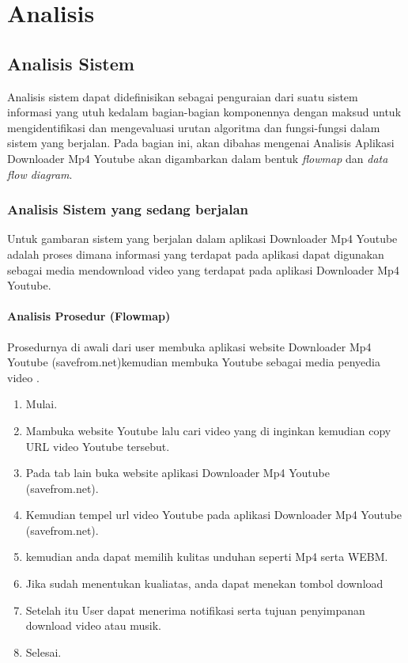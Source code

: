 \chapter{Analisis}
\section{Analisis Sistem}
Analisis sistem dapat didefinisikan sebagai penguraian dari suatu sistem informasi yang utuh kedalam bagian-bagian komponennya dengan maksud untuk mengidentifikasi dan mengevaluasi urutan algoritma dan fungsi-fungsi dalam sistem yang berjalan. Pada bagian ini, akan dibahas mengenai Analisis Aplikasi Downloader Mp4 Youtube akan digambarkan dalam bentuk \textit{flowmap} dan \textit{data flow diagram}.

\subsection{Analisis Sistem yang sedang berjalan}
Untuk gambaran sistem yang berjalan dalam aplikasi Downloader Mp4 Youtube adalah proses dimana informasi yang terdapat pada aplikasi dapat digunakan sebagai media mendownload video yang terdapat pada aplikasi Downloader Mp4 Youtube. 

\subsubsection{Analisis Prosedur (Flowmap)}
Prosedurnya di awali dari user membuka aplikasi website Downloader Mp4 Youtube {(savefrom.net)}kemudian membuka Youtube sebagai media penyedia video .

\begin{enumerate}
    \item Mulai.
    \item Mambuka website Youtube lalu cari video yang di inginkan kemudian copy URL video Youtube tersebut.
    \item Pada tab lain buka website aplikasi Downloader Mp4 Youtube {(savefrom.net)}.
    \item Kemudian tempel url video Youtube pada aplikasi Downloader Mp4 Youtube {(savefrom.net)}.
    \item kemudian anda dapat memilih kulitas unduhan seperti Mp4 serta WEBM.
    \item Jika sudah menentukan kualiatas, anda dapat menekan tombol download 
    \item Setelah itu User dapat menerima notifikasi serta tujuan penyimpanan download video atau musik.
    \item Selesai.
\end{enumerate}


